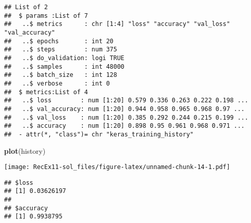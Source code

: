 \documentclass[]{article}
\newenvironment{Shaded}{\begin{snugshade}}{\end{snugshade}}
\newcommand{\KeywordTok}[1]{\textcolor[rgb]{0.13,0.29,0.53}{\textbf{#1}}}
\newcommand{\NormalTok}[1]{#1}
\newcommand{\OperatorTok}[1]{\textcolor[rgb]{0.81,0.36,0.00}{\textbf{#1}}}
\newcommand{\StringTok}[1]{\textcolor[rgb]{0.31,0.60,0.02}{#1}}
\begin{document}
\begin{verbatim}
## List of 2
##  $ params :List of 7
##   ..$ metrics      : chr [1:4] "loss" "accuracy" "val_loss" "val_accuracy"
##   ..$ epochs       : int 20
##   ..$ steps        : num 375
##   ..$ do_validation: logi TRUE
##   ..$ samples      : int 48000
##   ..$ batch_size   : int 128
##   ..$ verbose      : int 0
##  $ metrics:List of 4
##   ..$ loss        : num [1:20] 0.579 0.336 0.263 0.222 0.198 ...
##   ..$ val_accuracy: num [1:20] 0.944 0.958 0.965 0.968 0.97 ...
##   ..$ val_loss    : num [1:20] 0.385 0.292 0.244 0.215 0.199 ...
##   ..$ accuracy    : num [1:20] 0.898 0.95 0.961 0.968 0.971 ...
##  - attr(*, "class")= chr "keras_training_history"
\end{verbatim}

\begin{Shaded}
\begin{Highlighting}[]
\KeywordTok{plot}\NormalTok{(history)}
\end{Highlighting}
\end{Shaded}

\texttt{[image: RecEx11-sol\_files/figure-latex/unnamed-chunk-14-1.pdf]}

\begin{Shaded}
\end{Shaded}

\begin{verbatim}
## $loss
## [1] 0.03626197
## 
## $accuracy
## [1] 0.9938795
\end{verbatim}
\end{document}
